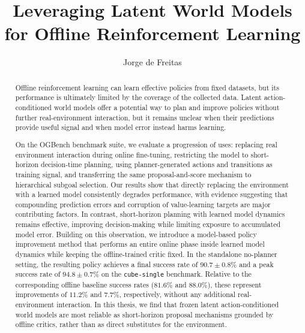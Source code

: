 \documentclass[a4paper, twoside]{report}
\title{Leveraging Latent World Models for Offline Reinforcement Learning}
\author{Jorge de Freitas}
\begin{document}


\begin{abstract}

Offline reinforcement learning can learn effective policies from fixed datasets, but its performance is ultimately limited by the coverage of the collected data. Latent action-conditioned world models offer a potential way to plan and improve policies without further real-environment interaction, but it remains unclear when their predictions provide useful signal and when model error instead harms learning.

On the OGBench benchmark suite, we evaluate a progression of uses: replacing real environment interaction during online fine-tuning, restricting the model to short-horizon decision-time planning, using planner-generated actions and transitions as training signal, and transferring the same proposal-and-score mechanism to hierarchical subgoal selection.
Our results show that directly replacing the environment with a learned model consistently degrades performance, with evidence suggesting that compounding prediction errors and corruption of value-learning targets are major contributing factors. In contrast, short-horizon planning with learned model dynamics remains effective, improving decision-making while limiting exposure to accumulated model error.
Building on this observation, we introduce a model-based policy improvement method that performs an entire online phase inside learned model dynamics while keeping the offline-trained critic fixed. In the standalone no-planner setting, the resulting policy achieves a final success rate of $90.7 \pm 0.8\%$ and a peak success rate of $94.8 \pm 0.7\%$ on the \texttt{cube-single} benchmark. Relative to the corresponding offline baseline success rates ($81.6\%$ and $88.0\%$), these represent improvements of $11.2\%$ and $7.7\%$, respectively, without any additional real-environment interaction.
In this thesis, we find that frozen latent action-conditioned world models are most reliable as short-horizon proposal mechanisms grounded by offline critics, rather than as direct substitutes for the environment.

\end{abstract}
\end{document}
